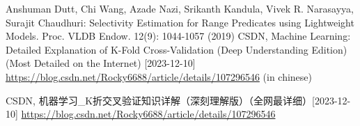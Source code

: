 \documentclass[UTF8, 12pt, a4paper, oneside]{ctexart}
\begin{document}
\begin{thebibliography}{99}
         Anshuman Dutt, Chi Wang, Azade Nazi, Srikanth Kandula, Vivek R. Narasayya, Surajit Chaudhuri: Selectivity Estimation for Range Predicates using Lightweight Models. Proc. VLDB Endow. 12(9): 1044-1057 (2019)
         CSDN, Machine Learning: Detailed Explanation of K-Fold Cross-Validation (Deep Understanding Edition) (Most Detailed on the Internet) [2023-12-10] \url{https://blog.csdn.net/Rocky6688/article/details/107296546} (in chinese) \par CSDN, 机器学习\_K折交叉验证知识详解（深刻理解版）（全网最详细）[2023-12-10] \url{https://blog.csdn.net/Rocky6688/article/details/107296546}  
    \end{thebibliography}
        
\end{document}
